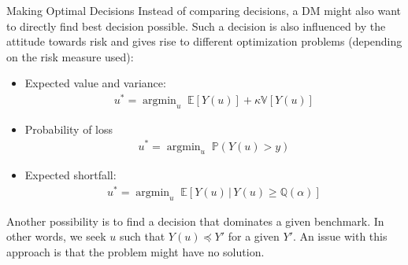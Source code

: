 \documentclass[9pt]{beamer}
\begin{document}
%
\begin{frame}{Making Optimal Decisions}
Instead of comparing decisions, a DM might also want to directly find best decision possible. Such a decision is also influenced by the attitude towards risk and gives rise to different optimization problems (depending on the risk measure used):
\begin{block}{}
\begin{itemize}
\item Expected value and variance:
\begin{align*}
u^*=\mathop{\textrm{argmin}}_u\; \mathbb{E}[Y(u)]+ \kappa \mathbb{V}[Y(u)]
\end{align*}
\item Probability of loss
\begin{align*}
u^*=\mathop{\textrm{argmin}}_u\; \mathbb{P}(Y(u)>y)
\end{align*}
\item Expected shortfall: 
\begin{align*}
u^*=\mathop{\textrm{argmin}}_u\; \mathbb{E}[Y(u)\,|\,Y(u)\geq \mathbb{Q}(\alpha)]
\end{align*}
\end{itemize}
\end{block}
Another possibility is to find a decision that dominates a given benchmark. In other words, we seek $u$ such that $Y(u)\preceq Y'$ for a given $Y'$.  An issue with this approach is that the problem might have no solution. 
\end{frame}
\end{document}
